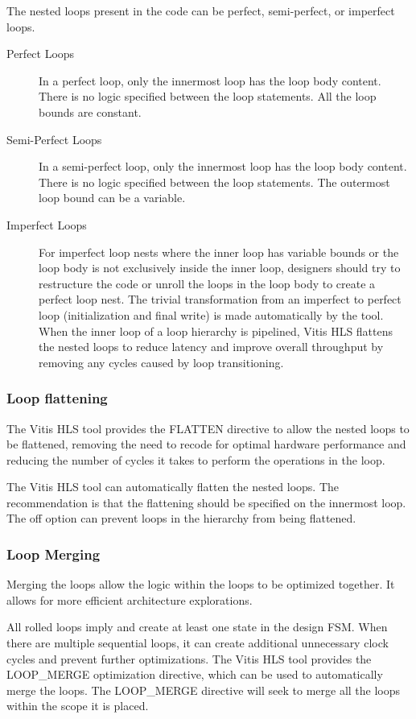 The nested loops present in the code can be perfect, semi-perfect, or imperfect loops.
\begin{description}
  \item[Perfect Loops] In a perfect loop, only the innermost loop has the loop body content. There is no logic specified between the loop statements. All the loop bounds are constant.
  \item[Semi-Perfect Loops] In a semi-perfect loop, only the innermost loop has the loop body content. There is no logic specified between the loop statements. The outermost loop bound can be a variable.
  \item[Imperfect Loops] For imperfect loop nests where the inner loop has variable bounds or the loop body is not exclusively inside the inner loop, designers should try to restructure the code or unroll the loops in the loop body to create a perfect loop nest. The trivial transformation from an imperfect to perfect loop (initialization and
  final write) is made automatically by the tool. When the inner loop of a loop hierarchy is pipelined, Vitis HLS flattens the nested loops to reduce latency and improve overall throughput by removing any cycles caused by loop transitioning.
\end{description}

\subsubsection{Loop flattening}
The Vitis HLS tool provides the FLATTEN directive to allow the nested loops to be flattened, removing the need to recode for optimal hardware performance and reducing the number of cycles it takes to perform the operations in the loop.

\par The Vitis HLS tool can automatically flatten the nested loops. The recommendation is that the flattening should be specified on the innermost loop. The off option can prevent loops in the hierarchy from being flattened.

\subsubsection{Loop Merging}
Merging the loops allow the logic within the loops to be optimized together. It allows for more efficient architecture explorations.

All rolled loops imply and create at least one state in the design FSM. When there are multiple sequential loops, it can create additional unnecessary clock cycles and prevent further optimizations. The Vitis HLS tool provides the LOOP\_MERGE optimization directive, which can be
used to automatically merge the loops. The LOOP\_MERGE directive will seek to merge all the loops within the scope it is placed.


